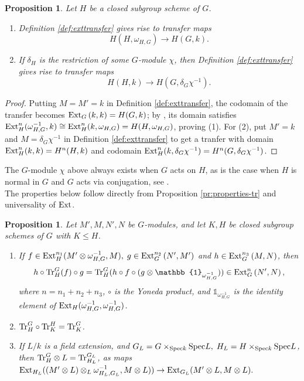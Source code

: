 \documentclass[12pt]{amsart}
\newtheorem{proposition}[theorem]{Proposition}
\theoremstyle{definition}
\begin{document}
\begin{proposition} Let $H$ be a closed subgroup scheme of $G$.
	\begin{enumerate}
		\item
		Definition \ref{def:exttransfer} gives rise to transfer maps
		\[
		H (H,\omega_{H,G})\rightarrow H (G,k).
		\]
		\item If $\delta_H$ is the restriction of some $G$-module $\chi $, then Definition \ref{def:exttransfer} gives rise to transfer maps
		\[
		H (H,k)\rightarrow H (G,\delta_G \chi^{-1}).
		\]
	\end{enumerate}
\end{proposition}
\begin{proof}
	Putting $M=M'=k$ in Definition \ref{def:exttransfer}, the codomain of the transfer becomes ${\rm Ext}_G\left(k,k\right)=H(G,k)$; by \cite[I.4.4]{MR2015057}, its domain satisfies
	$
	{\rm Ext}_H^n(\omega_{H,G}^{-1},k)\cong {\rm Ext}_H^n(k,\omega_{H,G})=H (H,\omega_{H,G})$, proving (1). For (2), put $M'=k$ and $M=\delta_G\chi^{-1}$ in Definition \ref{def:exttransfer} to get a tranfer with domain ${\rm Ext}_H^n(k,k)=H^n(H,k)$ and codomain ${\rm Ext}_H^n(k,\delta_G\chi^{-1})=H^n(G,\delta_G\chi^{-1})$.
\end{proof}

 The $G$-module $\chi $ above always exists when $G$ acts on $H$, as is the case when $H$ is normal in $G$ and $G$ acts via conjugation, see \cite[I.8.19]{MR2015057}.
\\

The properties below follow directly from Proposition \ref{pr:properties-tr} and universality of ${\rm Ext}$.

\begin{proposition}\label{prop:exttrprop}
	Let $M',M,N',N$ be $G$-modules, and let $K,H$ be closed subgroup schemes of $G$ with $K\leq H$.
	\begin{enumerate}
		\item If $f\in{\rm Ext}_H^{n_1}(M'\otimes\omega_{H,G}^{-1},M),\;g\in{\rm Ext}_G^{n_2}\left(N', M'\right)$ and $h\in{\rm Ext}_G^{n_3}\left(M,N\right)$, then 
		\[
		h\circ {\rm Tr}_{H}^G(f)\circ g={\rm Tr}_{H}^G(h \circ f\circ (g\otimes\mathbb{1}_{\omega_{H,G}^{-1}}))
		\in
		{\rm Ext}_G^{n}\left(N',N\right),
		\]
		where $n=n_1+n_2+n_3$, $\circ$ is the Yoneda product, and $\mathbb{1}_{\omega_{H,G}^{-1}}$ is the identity element of ${\rm Ext}_H(\omega_{H,G}^{-1},\omega_{H,G}^{-1})$.
		\item ${\rm Tr}_{H}^G\circ{\rm Tr}_{K}^H={\rm Tr}_{K}^G$.\\
		\item If $L/k$  is a field extension, and $G_L=G\times_{{\rm Spec} k}{\rm Spec}L,\;H_L=H\times_{{\rm Spec} k}{\rm Spec}L$, then ${\rm Tr}_{H}^G\otimes L={\rm Tr}_{H_L}^{G_L}$, as maps
		$
		{\rm Ext}_{H_L}((M'\otimes L)\otimes_L\omega_{H_L,G_L}^{-1},M\otimes L))\rightarrow
		{\rm Ext}_{G_L}(M'\otimes  L,M\otimes  L).
		$
	\end{enumerate}
\end{proposition}
\end{document}
